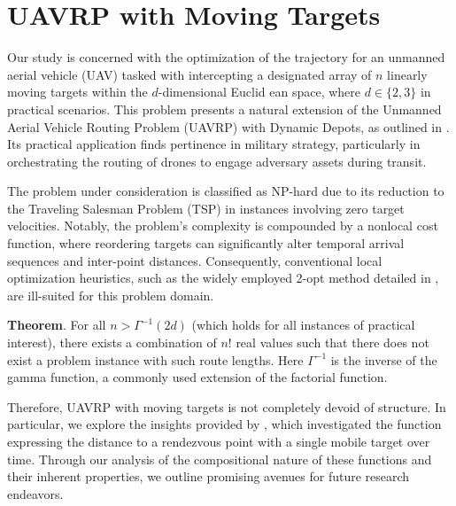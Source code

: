 \documentclass{SHVpaper}
\begin{document}
\section{UAVRP with Moving Targets}


Our study is concerned with the optimization of the trajectory for an unmanned aerial vehicle (UAV) tasked with intercepting a designated array of $n$ linearly moving targets within the $d$-dimensional Euclid
ean space, where $d \in \{2, 3\}$ in practical scenarios. This problem presents a natural extension of the Unmanned Aerial Vehicle Routing Problem (UAVRP) with Dynamic Depots, as outlined in \cite{dynamic-depots}. Its practical application finds pertinence in military strategy, particularly in orchestrating the routing of drones to engage adversary assets during transit.

The problem under consideration is classified as NP-hard due to its reduction to the Traveling Salesman Problem (TSP) in instances involving zero target velocities. Notably, the problem's complexity is compounded by a nonlocal cost function, where reordering targets can significantly alter temporal arrival sequences and inter-point distances. Consequently, conventional local optimization heuristics, such as the widely employed 2-opt method detailed in \cite{two-opt}, are ill-suited for this problem domain.

\textbf{Theorem}. For all $n > \Gamma^{-1}(2d)$ (which holds for all instances of practical interest), there exists a combination of $n!$ real values such that there does not exist a problem instance with such route lengths. Here $\Gamma^{-1}$ is the inverse of the gamma function, a commonly used extension of the factorial function.

Therefore, UAVRP with moving targets is not completely devoid of structure. In particular, we explore the insights provided by \cite{trig-landing}, which investigated the function expressing the distance to a rendezvous point with a single mobile target over time. Through our analysis of the compositional nature of these functions and their inherent properties, we outline promising avenues for future research endeavors.
\end{document}
